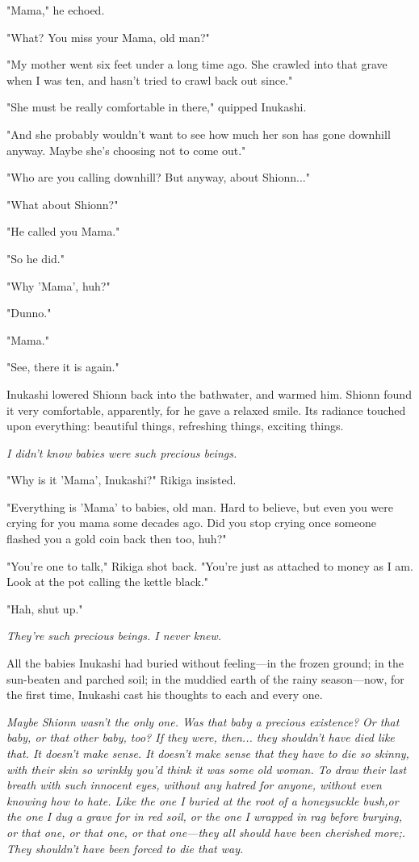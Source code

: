 "Mama," he echoed.

"What? You miss your Mama, old man?"

"My mother went six feet under a long time ago. She crawled into that
grave when I was ten, and hasn't tried to crawl back out since."

"She must be really comfortable in there," quipped Inukashi.~

"And she probably wouldn't want to see how much her son has gone
downhill anyway. Maybe she's choosing not to come out."

"Who are you calling downhill? But anyway, about Shionn..."

"What about Shionn?"

"He called you Mama."

"So he did."

"Why 'Mama', huh?"

"Dunno."

"Mama."

"See, there it is again."

Inukashi lowered Shionn back into the bathwater, and warmed him. Shionn
found it very comfortable, apparently, for he gave a relaxed smile. Its
radiance touched upon everything: beautiful things, refreshing things,
exciting things.

\emph{I didn't know babies were such precious beings.}

"Why is it 'Mama', Inukashi?" Rikiga insisted.

"Everything is 'Mama' to babies, old man. Hard to believe, but even you
were crying for you mama some decades ago. Did you stop crying once
someone flashed you a gold coin back then too, huh?"

"You're one to talk," Rikiga shot back. "You're just as attached to
money as I am. Look at the pot calling the kettle black."

"Hah, shut up."

\emph{They're such precious beings. I never knew.}

All the babies Inukashi had buried without feeling---in the frozen ground;
in the sun-beaten and parched soil; in the muddied earth of the rainy
season---now, for the first time, Inukashi cast his thoughts to each and
every one.

\emph{Maybe Shionn wasn't the only one. Was that baby a precious existence? Or
that baby, or that other baby, too? If they were, then... they shouldn't
have died like that. It doesn't make sense. It doesn't make sense that
they have to die so skinny, with their skin so wrinkly you'd think it
was some old woman. To draw their last breath with such innocent eyes,
without any hatred for anyone, without even knowing how to hate. Like
the one I buried at the root of a honeysuckle bush,or the one I dug a
grave for in red soil, or the one I wrapped in rag before burying, or
that one, or that one, or that one---they all should have been cherished
more;. They shouldn't have been forced to die that way.}

